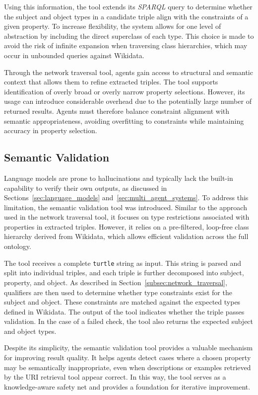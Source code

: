 \documentclass[a4paper,oneside,bibliography=totoc]{scrbook}
\begin{document}
Using this information, the tool extends its \textit{SPARQL} query to determine whether the subject and object types in a candidate triple align with the constraints of a given property. To increase flexibility, the system allows for one level of abstraction by including the direct superclass of each type. This choice is made to avoid the risk of infinite expansion when traversing class hierarchies, which may occur in unbounded queries against Wikidata.

Through the network traversal tool, agents gain access to structural and semantic context that allows them to refine extracted triples. The tool supports identification of overly broad or overly narrow property selections. However, its usage can introduce considerable overhead due to the potentially large number of returned results. Agents must therefore balance constraint alignment with semantic appropriateness, avoiding overfitting to constraints while maintaining accuracy in property selection.

\subsection{Semantic Validation}
\label{subsec:semantic_validation}

Language models are prone to hallucinations and typically lack the built-in capability to verify their own outputs, as discussed in Sections~\ref{sec:language_models} and~\ref{sec:multi_agent_systems}. To address this limitation, the semantic validation tool was introduced. Similar to the approach used in the network traversal tool, it focuses on type restrictions associated with properties in extracted triples. However, it relies on a pre-filtered, loop-free class hierarchy derived from Wikidata, which allows efficient validation across the full ontology.

The tool receives a complete \texttt{turtle} string as input. This string is parsed and split into individual triples, and each triple is further decomposed into subject, property, and object. As described in Section~\ref{subsec:network_traversal}, qualifiers are then used to determine whether type constraints exist for the subject and object. These constraints are matched against the expected types defined in Wikidata. The output of the tool indicates whether the triple passes validation. In the case of a failed check, the tool also returns the expected subject and object types.

Despite its simplicity, the semantic validation tool provides a valuable mechanism for improving result quality. It helps agents detect cases where a chosen property may be semantically inappropriate, even when descriptions or examples retrieved by the URI retrieval tool appear correct. In this way, the tool serves as a knowledge-aware safety net and provides a foundation for iterative improvement.
\end{document}

